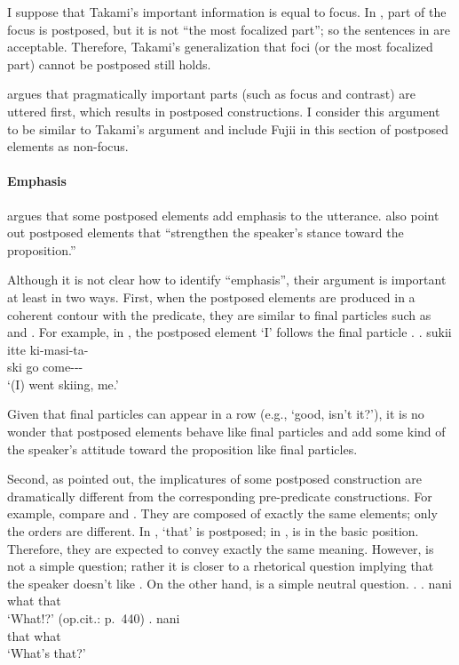 I suppose that Takami's important information is equal to focus.
In \Last, part of the focus is postposed,
but it is not ``the most focalized part'';
so the sentences in \Last are acceptable.
Therefore,
Takami's generalization that foci (or the most focalized part) cannot be postposed still holds.

 argues that pragmatically important parts (such as focus and contrast) are uttered first,
which results in postposed constructions.
I consider this argument to be similar to Takami's argument and
include Fujii in this section of postposed elements as non-focus.


\paragraph{Emphasis}

 argues that some postposed elements add emphasis to the utterance.
 also point out postposed elements that
``strengthen the speaker's stance toward the proposition.''

Although it is not clear how to identify ``emphasis'',
their argument is important at least in two ways.
First,
when the postposed elements are produced in a coherent contour with the predicate,
they are similar to final particles such as  and .
For example, in \Next,
the postposed element  `I' follows the final particle .
%
\exg. sukii itte ki-masi-ta-  \\
      ski go come---  \\
      `(I) went skiing, me.'
      \hfill{\cite[438]{onosuzuki92}}

Given that final particles can appear in a row (e.g.,  `good, isn't it?'),
it is no wonder that postposed elements behave like final particles
and add some kind of the speaker's attitude toward the proposition like final particles.

Second,
as  pointed out,
the implicatures of some postposed construction are dramatically different from the corresponding pre-pred\-i\-cate constructions.%
For example, compare \Next[a] and \Next[b].
They are composed of exactly the same elements;
only the orders are different.
In \Next[a],  `that' is postposed;
in \Next[b],  is in the basic position.
Therefore, they are expected to convey exactly the same meaning.
However, \Next[a] is not a simple question;
rather it is closer to a rhetorical question implying that the speaker doesn't like .
On the other hand, \Next[b] is a simple neutral question.
%
\ex.
 \ag. nani  \\
      what that \\
      `What!?'
      \hfill{(op.cit.: p.~440)}
 \bg.  nani \\
       that what \\
       `What's that?'


